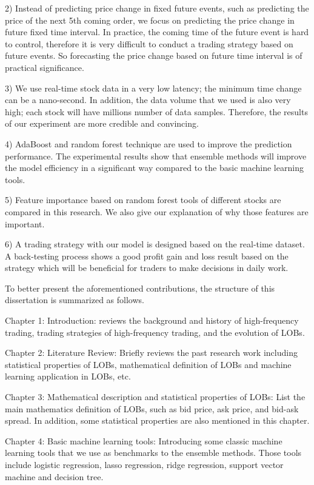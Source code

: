 2) Instead of predicting price change in fixed future events, such as predicting the price of the next 5th coming order,  we focus on predicting the price change in future fixed time interval. In practice,  the coming time of the future event is hard to control,  therefore it is very difficult to conduct a trading strategy based on future events. So forecasting the price change based on future time interval is of practical significance.

3) We use real-time stock data in a very low latency; the minimum time change can be a nano-second. In addition,  the data volume that we used is also very high; each stock will have millions number of data samples. Therefore,  the results of our experiment are more credible and convincing.  

4) AdaBoost and random forest technique are used to improve the prediction performance. The experimental results show that ensemble methods will improve the model efficiency in a significant way compared to the basic machine learning tools.

5) Feature importance based on random forest tools of different stocks are compared in this research. We also give our explanation of why those features are important.

6) A trading strategy with our model is designed based on the real-time dataset. A back-testing process shows a good profit gain and loss result based on the strategy which will be beneficial for traders to make decisions in daily work.

To better present the aforementioned contributions,  the structure of this dissertation is summarized as follows.

Chapter 1: Introduction: reviews the background and history of high-frequency trading, trading strategies of high-frequency trading, and the evolution of LOBs.

Chapter 2: Literature Review: Briefly reviews the past research work including statistical properties of LOBs,  mathematical definition of LOBs and machine learning application in LOBs, etc.

Chapter 3: Mathematical description and statistical properties of LOBs: List the main mathematics definition of LOBs,  such as bid price,  ask price,  and bid-ask spread. 
In addition, some statistical properties are also mentioned in this chapter.

Chapter 4: Basic machine learning tools: Introducing some classic machine learning tools that we use as benchmarks to the ensemble methods. Those tools include logistic regression,  lasso regression,  ridge regression,  support vector machine and decision tree. 

